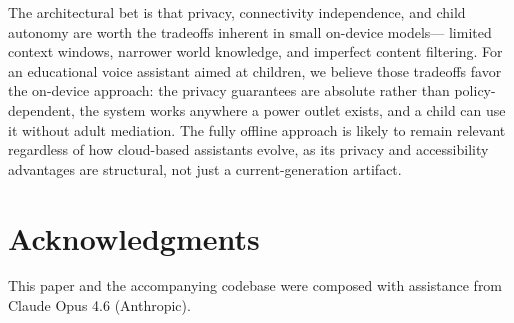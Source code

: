 \documentclass[11pt]{article}
\begin{document}
The architectural bet is that privacy, connectivity independence, and child autonomy are worth the tradeoffs inherent in small on-device models---%
limited context windows, narrower world knowledge, and imperfect content filtering.
For an educational voice assistant aimed at children, we believe those tradeoffs favor the on-device approach:
the privacy guarantees are absolute rather than policy-dependent,
the system works anywhere a power outlet exists,
and a child can use it without adult mediation.
The fully offline approach is likely to remain relevant regardless of how cloud-based assistants evolve,
as its privacy and accessibility advantages are structural, not just a current-generation artifact.

\section*{Acknowledgments}

This paper and the accompanying codebase were composed with assistance from Claude Opus 4.6 (Anthropic).



\end{document}
